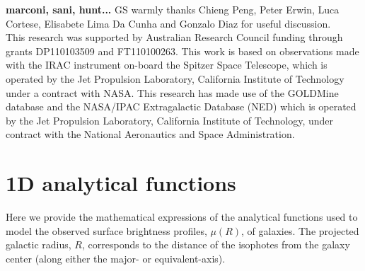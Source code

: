 \documentclass[preprint2]{emulateapj}
\begin{document}
%
%



\acknowledgments
{\bf marconi, sani, hunt...}
GS warmly thanks Chieng Peng, Peter Erwin, Luca Cortese, Elisabete Lima Da Cunha and Gonzalo Diaz 
for useful discussion. \\
This research was supported by Australian Research Council funding through grants
DP110103509 and FT110100263.
This work is based on observations made with the IRAC instrument \citep{fazio2004IRAC} 
on-board the Spitzer Space Telescope, 
which is operated by the Jet Propulsion Laboratory, 
California Institute of Technology under a contract with NASA.
This research has made use of the GOLDMine database \citep{goldmine} and the NASA/IPAC Extragalactic Database (NED) 
which is operated by the Jet Propulsion Laboratory, California Institute of Technology, 
under contract with the National Aeronautics and Space Administration. 

\appendix

\section{1D analytical functions}
\label{sec:app1}
Here we provide the mathematical expressions of the analytical functions used to model 
the observed surface brightness profiles, $\mu(R)$, of galaxies.
The projected galactic radius, $R$,
corresponds to the distance of the isophotes from the galaxy center (along either the major- or equivalent-axis). \\
\end{document}
